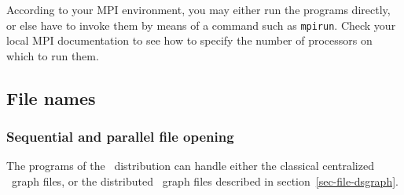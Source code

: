 According to your MPI environment, you may either run the programs
directly, or else have to invoke them by means of a command such as
{\tt mpirun}. Check your local MPI documentation to see how to
specify the number of processors on which to run them.

\subsection{File names}
\label{sec-prog-filename}

\subsubsection{Sequential and parallel file opening}

The programs of the \ptscotch\ distribution can handle either
the classical centralized \scotch\ graph files, or the
distributed \ptscotch\ graph files described in
section~\ref{sec-file-dsgraph}.

